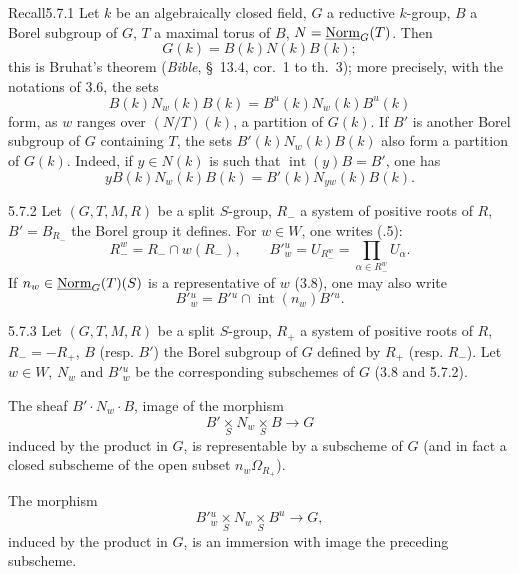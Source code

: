 \begin{enoncerm}{Recall}{5.7.1}\label{XXII.5.7.1}
Let $k$ be an algebraically closed field, $G$ a reductive $k$-group, $B$ a Borel subgroup of $G$, $T$ a maximal torus of $B$, $N=\underline{\mathrm{Norm}}_G(T)$. Then
\[
G(k)=B(k)N(k)B(k);
\]
this is Bruhat's theorem (\textit{Bible}, \S~13.4, cor.~1 to th.~3); more precisely, with the notations of 3.6, the sets
\[
B(k)N_w(k)B(k)=B^u(k)N_w(k)B^u(k)
\]
form, as $w$ ranges over $(N/T)(k)$, a partition of $G(k)$. If $B'$ is another Borel subgroup of $G$ containing $T$, the sets $B'(k)N_w(k)B(k)$ also form a partition of $G(k)$. Indeed, if $y\in N(k)$ is such that $\operatorname{int}(y)B=B'$, one has
\[
yB(k)N_w(k)B(k)=B'(k)N_{yw}(k)B(k).
\]
\end{enoncerm}
\begin{definition}{5.7.2}\label{XXII.5.7.2}
Let $(G,T,M,R)$ be a split $S$-group, $R_-$ a system of positive roots of $R$, $B'=B_{R_-}$ the Borel group it defines. For $w\in W$, one writes (.5):
\[
R_-^w=R_-\cap w(R_-),\qquad B'{}^u_w=U_{R_-^w}=\prod_{\alpha\in R_-^w}U_\alpha.
\]
If $n_w\in\underline{\mathrm{Norm}}_G(T)(S)$ is a representative of $w$ (3.8), one may also write
\[
B'{}^u_w=B'{}^u\cap\operatorname{int}(n_w)B'{}^u.
\]
\end{definition}
\begin{lemma}{5.7.3}\label{XXII.5.7.3}
Let $(G,T,M,R)$ be a split $S$-group, $R_+$ a system of positive roots of $R$, $R_-=-R_+$, $B$ (resp. $B'$) the Borel subgroup of $G$ defined by $R_+$ (resp. $R_-$). Let $w\in W$, $N_w$ and $B'{}^u_w$ be the corresponding subschemes of $G$ (3.8 and 5.7.2).
\begin{enumeratei}
\item The sheaf $B'\cdot N_w\cdot B$, image of the morphism
\[
B'\underset S\times N_w\underset S\times B\to G
\]
induced by the product in $G$, is representable by a subscheme of $G$ (and in fact a closed subscheme of the open subset $n_w\Omega_{R_+}$).
\item The morphism
\[
B'{}^u_w\underset S\times N_w\underset S\times B^u\to G,
\]
induced by the product in $G$, is an immersion with image the preceding subscheme.
\end{enumeratei}
\end{lemma}
